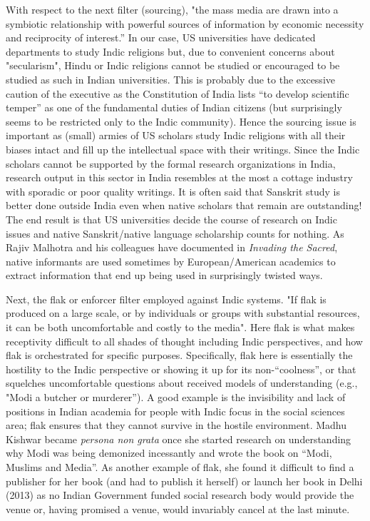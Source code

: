 With respect to the next filter (sourcing), "the mass media are drawn into a symbiotic relationship with powerful sources of information by economic necessity and reciprocity of interest.” In our case, US universities have dedicated departments to study Indic religions but, due to convenient concerns about "secularism", Hindu or Indic religions cannot be studied or encouraged to be studied as such in Indian universities. This is probably due to the excessive caution of the executive as the Constitution of India lists “to develop scientific temper” as one of the fundamental duties of Indian citizens (but surprisingly seems to be restricted only to the Indic community). Hence the sourcing issue is important as (small) armies of US scholars study Indic religions with all their biases intact and fill up the intellectual space with their writings. Since the Indic scholars cannot be supported by the formal research organizations in India, research output in this sector in India resembles at the most a cottage industry with sporadic or poor quality writings. It is often said that Sanskrit study is better done outside India even when native scholars that remain are outstanding! The end result is that US universities decide the course of research on Indic issues and native Sanskrit/native language scholarship counts for nothing. As Rajiv Malhotra and his colleagues have documented in {\sl Invading the Sacred}, native informants are used sometimes by European/American academics to extract information that end up being used in surprisingly twisted ways.

Next, the flak or enforcer filter employed against Indic systems. "If flak is produced on a large scale, or by individuals or groups with substantial resources, it can be both uncomfortable and costly to the media". Here flak is what makes receptivity difficult to all shades of thought including Indic perspectives, and how flak is orchestrated for specific purposes. Specifically, flak here is essentially the hostility to the Indic perspective or showing it up for its non-“coolness”, or that squelches uncomfortable questions about received models of understanding (e.g., "Modi a butcher or murderer”). A good example is the invisibility and lack of positions in Indian academia for people with Indic focus in the social sciences area; flak ensures that they cannot survive in the hostile environment. Madhu Kishwar became {\sl persona non grata} once she started research on understanding why Modi was being demonized incessantly and wrote the book on “Modi, Muslims and Media”. As another example of flak, she found it difficult to find a publisher for her book (and had to publish it herself) or launch her book in Delhi (2013) as no Indian Government funded social research body would provide the venue or, having promised a venue, would invariably cancel at the last minute.

